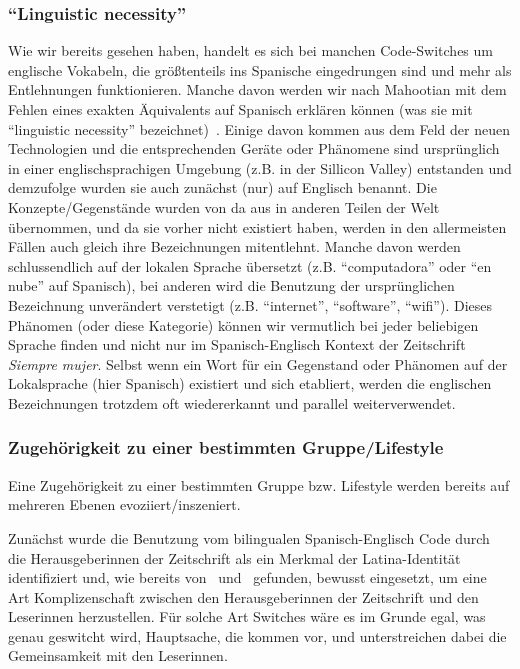 \subsubsection{``Linguistic necessity''}
Wie wir bereits gesehen haben, handelt es sich bei manchen Code-Switches um englische Vokabeln, die größtenteils ins Spanische eingedrungen sind und mehr als Entlehnungen funktionieren.
Manche davon werden wir nach Mahootian mit dem Fehlen eines exakten Äquivalents auf Spanisch erklären können (was sie mit ``linguistic necessity'' bezeichnet)~\cite{Mahootian05}.
Einige davon kommen aus dem Feld der neuen Technologien und die entsprechenden Geräte oder Phänomene sind ursprünglich in einer englischsprachigen Umgebung (z.B. in der Sillicon Valley) entstanden und demzufolge wurden sie auch zunächst (nur) auf Englisch benannt.
Die Konzepte/Gegenstände wurden von da aus in anderen Teilen der Welt übernommen, und da sie vorher nicht existiert haben, werden in den allermeisten Fällen auch gleich ihre Bezeichnungen mitentlehnt.
Manche davon werden schlussendlich auf der lokalen Sprache übersetzt (z.B. ``computadora'' oder ``en nube'' auf Spanisch), bei anderen wird die Benutzung der ursprünglichen Bezeichnung unverändert verstetigt (z.B. ``internet'', ``software'', ``wifi'').
Dieses Phänomen (oder diese Kategorie) können wir vermutlich bei jeder beliebigen Sprache finden und nicht nur im Spanisch-Englisch Kontext der Zeitschrift \textit{Siempre mujer}.
Selbst wenn ein Wort für ein Gegenstand oder Phänomen auf der Lokalsprache (hier Spanisch) existiert und sich etabliert, werden die englischen Bezeichnungen trotzdem oft wiedererkannt und parallel weiterverwendet.

\subsubsection{Zugehörigkeit zu einer bestimmten Gruppe/Lifestyle}
Eine Zugehörigkeit zu einer bestimmten Gruppe bzw. Lifestyle werden bereits auf mehreren Ebenen evoziiert/inszeniert.

Zunächst wurde die Benutzung vom bilingualen Spanisch-Englisch Code durch die Herausgeberinnen der Zeitschrift als ein Merkmal der Latina-Identität identifiziert und, wie bereits von~\cite{Ticknor12} und~\cite{Mahootian05} gefunden, bewusst eingesetzt, um eine Art Komplizenschaft zwischen den Herausgeberinnen der Zeitschrift und den Leserinnen herzustellen.
Für solche Art Switches wäre es im Grunde egal, was genau geswitcht wird, Hauptsache, die kommen vor, und unterstreichen dabei die Gemeinsamkeit mit den Leserinnen.

